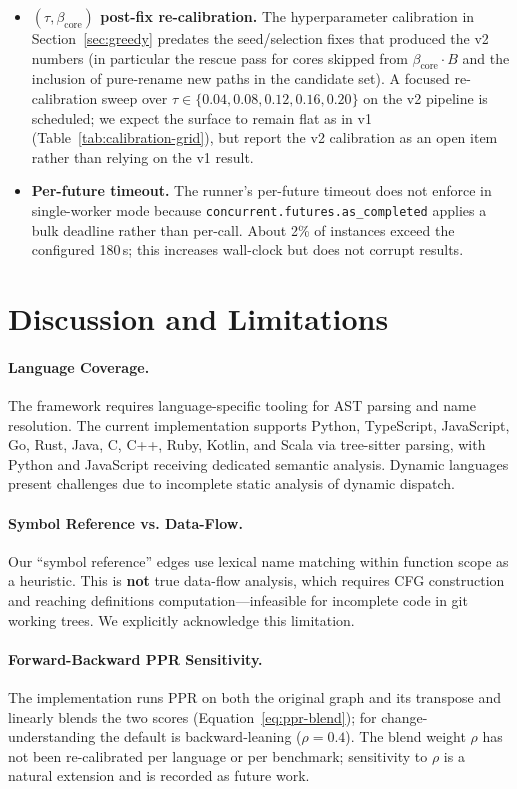 \documentclass[11pt, a4paper]{article}
\begin{document}
\begin{itemize}
    \item \textbf{$(\tau, \beta_{\mathrm{core}})$ post-fix re-calibration.} The hyperparameter calibration in Section~\ref{sec:greedy} predates the seed/selection fixes that produced the v2 numbers (in particular the rescue pass for cores skipped from $\beta_{\mathrm{core}}\cdot B$ and the inclusion of pure-rename new paths in the candidate set). A focused re-calibration sweep over $\tau \in \{0.04, 0.08, 0.12, 0.16, 0.20\}$ on the v2 pipeline is scheduled; we expect the surface to remain flat as in v1 (Table~\ref{tab:calibration-grid}), but report the v2 calibration as an open item rather than relying on the v1 result.
    \item \textbf{Per-future timeout.} The runner's per-future timeout does not enforce in single-worker mode because \texttt{concurrent.futures.as\_completed} applies a bulk deadline rather than per-call. About 2\% of instances exceed the configured 180\,s; this increases wall-clock but does not corrupt results.
\end{itemize}

\newpage
\section{Discussion and Limitations}

\paragraph{Language Coverage.}
The framework requires language-specific tooling for AST parsing and name resolution. The current implementation supports Python, TypeScript, JavaScript, Go, Rust, Java, C, C++, Ruby, Kotlin, and Scala via tree-sitter parsing, with Python and JavaScript receiving dedicated semantic analysis. Dynamic languages present challenges due to incomplete static analysis of dynamic dispatch.

\paragraph{Symbol Reference vs. Data-Flow.}
Our ``symbol reference'' edges use lexical name matching within function scope as a heuristic. This is \textbf{not} true data-flow analysis, which requires CFG construction and reaching definitions computation---infeasible for incomplete code in git working trees. We explicitly acknowledge this limitation.

\paragraph{Forward-Backward PPR Sensitivity.}
The implementation runs PPR on both the original graph and its transpose and linearly blends the two scores (Equation~\ref{eq:ppr-blend}); for change-understanding the default is backward-leaning ($\rho{=}0.4$). The blend weight $\rho$ has not been re-calibrated per language or per benchmark; sensitivity to $\rho$ is a natural extension and is recorded as future work.
\end{document}
